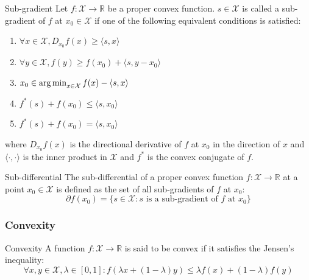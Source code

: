 \begin{definition}{Sub-gradient}
    Let $f: \mathcal{X} \to \mathbb{R}$ be a proper convex function. $s \in \mathcal{X}$ is called a sub-gradient of $f$ at $x_0 \in \mathcal{X}$ if one of the following equivalent conditions is satisfied:
    \begin{enumerate}
        \item $\forall x \in \mathcal{X}, D_{x_0} f(x) \geq \langle s, x \rangle$
        \item $\forall y \in \mathcal{X}, f(y) \geq f(x_0) + \langle s, y - x_0 \rangle$
        \item $x_0 \in \mathop{\mathrm{arg\,min}}_{x \in \mathcal{X}} f(x) - \langle s, x \rangle$
        \item $f^*(s) + f(x_0) \leq \langle s, x_0 \rangle$
        \item $f^*(s) + f(x_0) = \langle s, x_0 \rangle$
    \end{enumerate}
    where $D_{x_0} f(x)$ is the directional derivative of $f$ at $x_0$ in the direction of $x$ and $\langle \cdot, \cdot \rangle$ is the inner product in $\mathcal{X}$ and $f^*$ is the convex conjugate of $f$.
\end{definition}

\begin{definition}{Sub-differential}
    The sub-differential of a proper convex function $f: \mathcal{X} \to \mathbb{R}$ at a point $x_0 \in \mathcal{X}$ is defined as the set of all sub-gradients of $f$ at $x_0$:
    \begin{equation}
        \partial f(x_0) = \{ s \in \mathcal{X} : s \text{ is a sub-gradient of } f \text{ at } x_0\}
    \end{equation}
\end{definition}

\subsubsection{Convexity}

\begin{definition}{Convexity}
    A function $f: \mathcal{X} \to \mathbb{R}$ is said to be convex if it satisfies the Jensen's inequality:
    \begin{equation}
        \forall x, y \in \mathcal{X}, \lambda \in [0, 1]: f(\lambda x + (1 - \lambda) y) \leq \lambda f(x) + (1 - \lambda) f(y)
    \end{equation}
    \label{def:convexity}
\end{definition}

